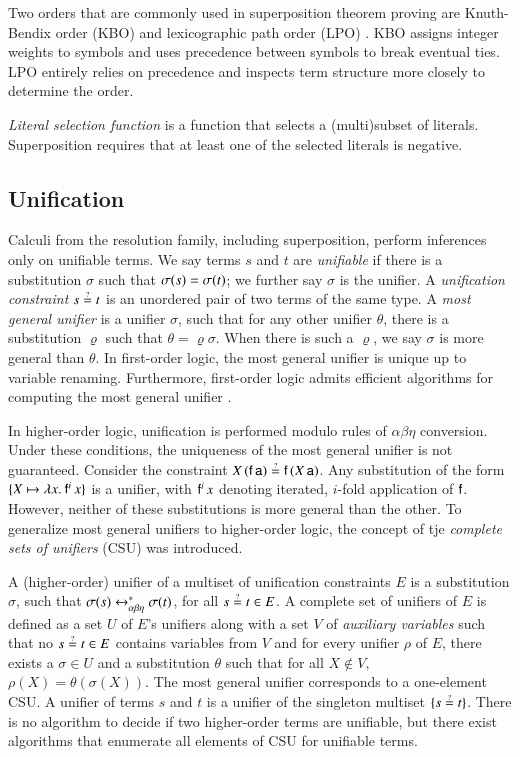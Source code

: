 Two orders that are commonly used in superposition theorem proving are
Knuth-Bendix order (KBO) \cite[Sect.~5.4.4]{bn-98-tr-and-all-that} and
lexicographic path order (LPO) \cite[Sect.~5.4.2]{bn-98-tr-and-all-that}.
KBO assigns integer weights to symbols and uses precedence between symbols to
break eventual ties. LPO entirely relies on precedence and inspects term
structure more closely to determine the order. 

\newcommand{\selfun}{\ensuremath{\mathit{Sel}}}
{\em Literal selection function} is a function that selects a (multi)subset of literals.
Superposition requires that at least one of the selected literals is negative. 

\subsection{Unification}

Calculi from the resolution family, including superposition, perform inferences
only on unifiable terms. We say terms $s$ and $t$ are {\em unifiable} if there is a
substitution $\sigma$ such that $\sigma(s) = \sigma(t)$; we further say
$\sigma$ is the unifier. A \emph{unification constraint} $s \unif t$ is an
unordered pair of two terms of the same type. A \emph{most general unifier} is a
unifier $\sigma$, such that for any other unifier $\theta$, there is a
substitution $\varrho$ such that $\theta = \varrho\sigma$. When there is such a
$\varrho$, we say $\sigma$ is more general than $\theta$. In first-order logic,
the most general unifier is unique up to variable renaming. Furthermore,
first-order logic admits efficient algorithms for computing the most general
unifier \cite{hv-09-unifalgs}.

In higher-order logic, unification is performed modulo rules of
$\alpha\beta\eta$ conversion. Under these conditions, the uniqueness of the most
general unifier is not guaranteed. Consider the constraint $X \,
(\cst{f} \, \cst{a}) \unif \cst{f} \, (X \, \cst{a})$. Any substitution of the
form $\{ X \mapsto \lambda x.\> \mathsf{f}^i \, x \}$ is a unifier, with $\mathsf{f}^i \, x$
denoting iterated, $i$-fold application of $\mathsf{f}$. However, neither of these substitutions
is more general than the other. To generalize most general
unifiers to higher-order logic, the concept of tje {\em complete sets of unifiers} (CSU) was
introduced.

A (higher-order) unifier of a multiset of unification constraints $E$ is
a substitution $\sigma$, such that $\sigma(s) \leftrightarrow^*_{\alpha\beta\eta} \sigma(t)$, for all $s \unif t
\in E$. A complete set of unifiers of $E$ is defined as a
set $U$ of $E$'s unifiers along with a set $V$ of \emph{auxiliary variables}
such that no $s \unif t \in E$ contains variables from $V$ and for every unifier
$\rho$ of $E$, there exists a $\sigma \in U$ and a substitution $\theta$ such
that for all $X\not\in V,$ $\rho(X) = \theta(\sigma(X))$. The most general unifier
corresponds to a one-element CSU. A unifier of terms $s$ and $t$ is a unifier of
the singleton multiset $\{ s \unif t \}$. There is no algorithm to decide
if two higher-order terms are unifiable, but there exist algorithms
that enumerate all elements of CSU for unifiable terms.

